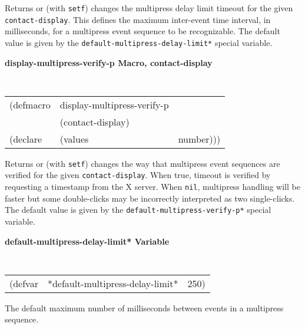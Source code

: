 \begin{flushright} \parbox[t]{6.125in}{
Returns or (with {\tt setf}) changes the multipress delay limit timeout
for the given {\tt contact-display}. This defines the maximum
inter-event time
interval, in milliseconds, for a multipress event sequence to be
recognizable. The default value is given by the
{\tt *default-multipress-delay-limit*} special variable.
}\end{flushright}

{\samepage
{\large {\bf display-multipress-verify-p \hfill Macro, contact-display}} 
\begin{flushright} \parbox[t]{6.125in}{
\tt
\begin{tabular}{lll}
\raggedright
(defmacro & display-multipress-verify-p & \\ 
& (contact-display) \\
(declare &(values  & number)))
\end{tabular}
\rm

}\end{flushright}}

\begin{flushright} \parbox[t]{6.125in}{
Returns or (with {\tt setf}) changes the way that multipress event
sequences are verified for the given {\tt contact-display}. When true, 
timeout is verified by requesting
a timestamp from the X server. When {\tt nil}, multipress handling
will be faster but some double-clicks may be incorrectly interpreted as
two single-clicks. 
The default
value is given by the {\tt *default-multipress-verify-p*} special variable.
}\end{flushright}


{\samepage
{\large {\bf *default-multipress-delay-limit* \hfill Variable}} 
\begin{flushright} \parbox[t]{6.125in}{
\tt
\begin{tabular}{lll}
\raggedright
(defvar & *default-multipress-delay-limit* & 250)
\end{tabular}
\rm

}\end{flushright}

\begin{flushright} \parbox[t]{6.125in}{
The default maximum number of milliseconds between events in a
multipress sequence.

}\end{flushright}}


